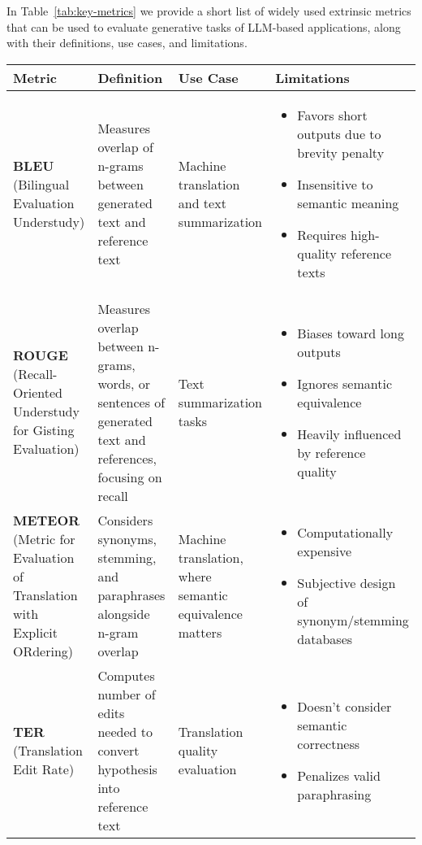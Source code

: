 In Table~\ref{tab:key-metrics} we provide a short list of widely used extrinsic metrics that can be used to evaluate generative tasks of LLM-based applications, along with their definitions, use cases, and limitations.
\begin{table*}[htbp]
\caption{Key Metrics for Evaluating Generative Tasks}
\label{tab:key-metrics}
\begin{tabular}{p{}p{}p{}p{}}
\hline
\textbf{Metric} & \textbf{Definition} & \textbf{Use Case} & \textbf{Limitations} \\
\hline
\textbf{BLEU} (Bilingual Evaluation Understudy) & Measures overlap of n-grams between generated text and reference text & Machine translation and text summarization & \begin{itemize}\item Favors short outputs due to brevity penalty\item Insensitive to semantic meaning\item Requires high-quality reference texts\end{itemize} \\
\hline
\textbf{ROUGE} (Recall-Oriented Understudy for Gisting Evaluation) & Measures overlap between n-grams, words, or sentences of generated text and references, focusing on recall & Text summarization tasks & \begin{itemize}\item Biases toward long outputs\item Ignores semantic equivalence\item Heavily influenced by reference quality\end{itemize} \\
\hline
\textbf{METEOR} (Metric for Evaluation of Translation with Explicit ORdering) & Considers synonyms, stemming, and paraphrases alongside n-gram overlap & Machine translation, where semantic equivalence matters & \begin{itemize}\item Computationally expensive\item Subjective design of synonym/stemming databases\end{itemize} \\
\hline
\textbf{TER} (Translation Edit Rate) & Computes number of edits needed to convert hypothesis into reference text & Translation quality evaluation & \begin{itemize}\item Doesn't consider semantic correctness\item Penalizes valid paraphrasing\end{itemize} \\

\end{tabular}
\end{table*}
